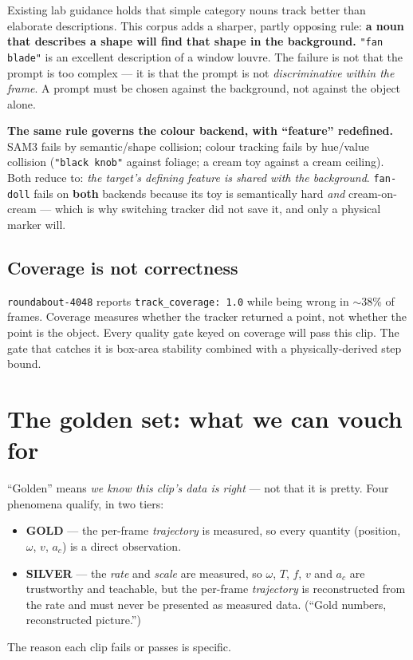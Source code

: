 \documentclass[11pt,a4paper]{article}
\begin{document}
Existing lab guidance holds that simple category nouns track better than elaborate
descriptions. This corpus adds a sharper, partly opposing rule: \textbf{a noun that describes a
shape will find that shape in the background.} \texttt{"fan blade"} is an excellent description
of a window louvre. The failure is not that the prompt is too complex --- it is that the prompt
is not \emph{discriminative within the frame}. A prompt must be chosen against the background,
not against the object alone.

\textbf{The same rule governs the colour backend, with ``feature'' redefined.} SAM3 fails by
semantic/shape collision; colour tracking fails by hue/value collision (\texttt{"black knob"}
against foliage; a cream toy against a cream ceiling). Both reduce to: \emph{the target's
defining feature is shared with the background}. \texttt{fan-doll} fails on \textbf{both}
backends because its toy is semantically hard \emph{and} cream-on-cream --- which is why
switching tracker did not save it, and only a physical marker will.

\subsection{Coverage is not correctness}
\label{sec:coverage}

\texttt{roundabout-4048} reports \texttt{track\_coverage: 1.0} while being wrong in
$\sim$38\% of frames. Coverage measures whether the tracker returned a point, not whether the
point is the object. Every quality gate keyed on coverage will pass this clip. The gate that
catches it is box-area stability combined with a physically-derived step bound.

\section{The golden set: what we can vouch for}
\label{sec:golden}

``Golden'' means \emph{we know this clip's data is right} --- not that it is pretty. Four
phenomena qualify, in two tiers:
\begin{itemize}
  \item \textbf{GOLD} --- the per-frame \emph{trajectory} is measured, so every quantity (position,
  $\omega$, $v$, $a_c$) is a direct observation.
  \item \textbf{SILVER} --- the \emph{rate} and \emph{scale} are measured, so $\omega$, $T$, $f$,
  $v$ and $a_c$ are trustworthy and teachable, but the per-frame \emph{trajectory} is reconstructed
  from the rate and must never be presented as measured data. (``Gold numbers, reconstructed
  picture.'')
\end{itemize}
The reason each clip fails or passes is specific.
\end{document}
